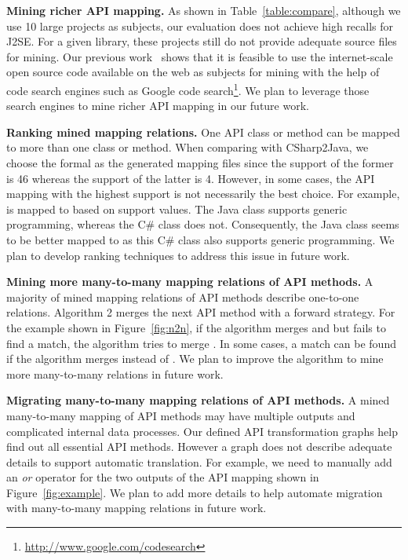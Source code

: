 \textbf{Mining richer API mapping.} As shown in
Table~\ref{table:compare}, although we use 10 large projects as
subjects, our evaluation does not achieve high recalls for J2SE. For
a given library, these projects still do not provide adequate source
files for mining. Our previous
work~\cite{thummalapenta07parseweb,thummalapentaase08spotweb} shows
that it is feasible to use the internet-scale open source code
available on the web as subjects for mining with the help of code
search engines such as Google code
search\footnote{\url{http://www.google.com/codesearch}}. We plan to
leverage those search engines to mine richer API mapping in our
future work.

\textbf{Ranking mined mapping relations.} One API class or method
can be mapped to more than one class or method. When comparing with
CSharp2Java, we choose the formal as the generated mapping files
since the support of the former is 46 whereas the support of the
latter is 4. However, in some cases, the API mapping with the
highest support is not necessarily the best choice. For example,
 is mapped to
 based on support values. The
Java class supports generic programming, whereas the C\# class does
not. Consequently, the Java class seems to be better mapped to
 as this C\# class also
supports generic programming. We plan to develop ranking techniques
to address this issue in future work.

\textbf{Mining more many-to-many mapping relations of API methods.}
A majority of mined mapping relations of API methods describe
one-to-one relations. Algorithm 2 merges the next API method with a
forward strategy. For the example shown in Figure~\ref{fig:n2n}, if
the algorithm merges  and  but
fails to find a match, the algorithm tries to merge
. In some cases, a match can be found if the
algorithm merges  instead of .
We plan to improve the algorithm to mine more many-to-many relations
in future work.

\textbf{Migrating many-to-many mapping relations of API methods.} A
mined many-to-many mapping of API methods may have multiple outputs
and complicated internal data processes. Our defined API
transformation graphs help find out all essential API methods.
However a graph does not describe adequate details to support
automatic translation. For example, we need to manually add an
\emph{or} operator for the two outputs of the API mapping shown in
Figure~\ref{fig:example}. We plan to add more details to help
automate migration with many-to-many mapping relations in future
work.

